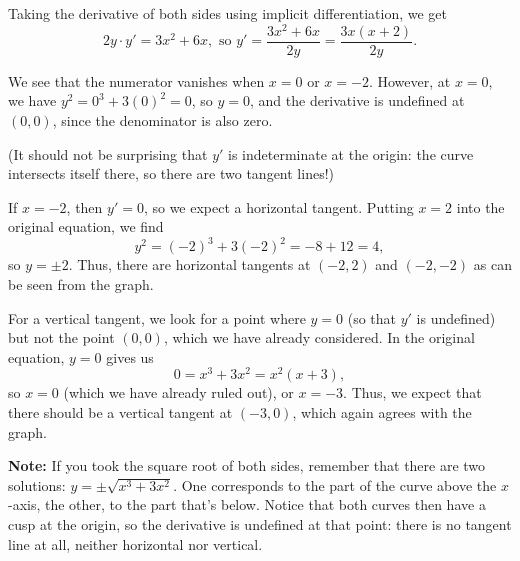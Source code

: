 \documentclass[12pt]{article}
\begin{document}
\begin{enumerate}
Taking the derivative of both sides using implicit differentiation, we get
\[
2y\cdot y' = 3x^2+6x, \text{ so } y' = \frac{3x^2+6x}{2y} = \frac{3x(x+2)}{2y}.
\]

We see that the numerator vanishes when $x=0$ or $x=-2$. However, at $x=0$, we have $y^2 = 0^3+3(0)^2 = 0$, so $y=0$, and the derivative is undefined at $(0,0)$, since the denominator is also zero.

(It should not be surprising that $y'$ is indeterminate at the origin: the curve intersects itself there, so there are two tangent lines!)

If $x=-2$, then $y'=0$, so we expect a horizontal tangent. Putting $x=2$ into the original equation, we find
\[
y^2 = (-2)^3+3(-2)^2 = -8+12 = 4,
\]
so $y=\pm 2$. Thus, there are horizontal tangents at $(-2,2)$ and $(-2,-2)$ as can be seen from the graph. 

For a vertical tangent, we look for a point where $y=0$ (so that $y'$ is undefined) but not the point $(0,0)$, which we have already considered. In the original equation, $y=0$ gives us
\[
0=x^3+3x^2 = x^2(x+3),
\]
so $x=0$ (which we have already ruled out), or $x=-3$. Thus, we expect that there should be a vertical tangent at $(-3,0)$, which again agrees with the graph.

\bigskip

\textbf{Note:} If you took the square root of both sides, remember that there are two solutions: $y=\pm \sqrt{x^3+3x^2}$. One corresponds to the part of the curve above the $x$-axis, the other, to the part that's below. Notice that both curves then have a cusp at the origin, so the derivative is undefined at that point: there is no tangent line at all, neither horizontal nor vertical.
\end{enumerate}
\end{document}
